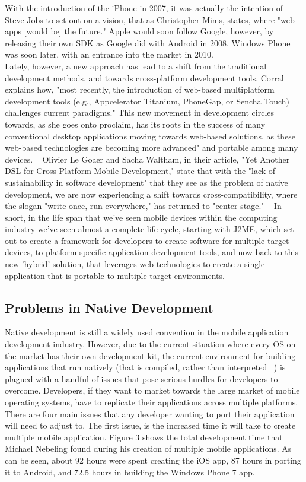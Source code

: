 \documentclass[11pt, twocolumn]{article}
\begin{document}
With the introduction of the iPhone in 2007, it was actually the intention of Steve Jobs to set out on a vision, that as Christopher Mims, states, where "web apps [would be] the future."  Apple would soon follow Google, however, by releasing their own SDK as Google did with Android in 2008.  Windows Phone was soon later, with an entrance into the market in 2010. ~\cite{Dediu2011}\\

Lately, however, a new approach has lead to a shift from the traditional development methods, and towards cross-platform development tools.  Corral explains how, "most recently, the introduction of web-based multiplatform development tools (e.g., Appcelerator Titanium, PhoneGap, or Sencha Touch) challenges current paradigms."  This new movement in development circles towards, as she goes onto proclaim, has its roots in the success of many conventional desktop applications moving towards web-based solutions, as these web-based technologies are becoming more advanced" and portable among many devices. ~\cite{Corral2011}  Olivier Le Goaer and Sacha Waltham, in their article, "Yet Another DSL for Cross-Platform Mobile Development," state that with the "lack of sustainability in software development" that they see as the problem of native development, we are now experiencing a shift towards cross-compatibility, where the slogan "write once, run everywhere," has returned to "center-stage." ~\cite{Goaer2013} In short, in the life span that we've seen mobile devices within the computing industry we've seen almost a complete life-cycle, starting with J2ME, which set out to create a framework for developers to create software for multiple target devices, to platform-specific application development tools, and now back to this new 'hybrid' solution, that leverages web technologies to create a single application that is portable to multiple target environments.\\

\subsection{Problems in Native Development}
Native development is still a widely used convention in the mobile application development industry.  However, due to the current situation where every OS on the market has their own development kit, the current environment for building applications that run natively (that is compiled, rather than interpreted ~\cite{Leroux2011}) is plagued with a handful of issues that pose serious hurdles for developers to overcome.  Developers, if they want to market towards the large market of mobile operating systems, have to replicate their applications across multiple platforms.  There are four main issues that any developer wanting to port their application will need to adjust to.  The first issue, is the increased time it will take to create multiple mobile application.  Figure 3 shows the total development time that Michael Nebeling found during his creation of multiple mobile applications.  As can be seen, about 92 hours were spent creating the iOS app, 87 hours in porting it to Android, and 72.5 hours in building the Windows Phone 7 app. ~\cite{Nebeling2013} 
\end{document}
